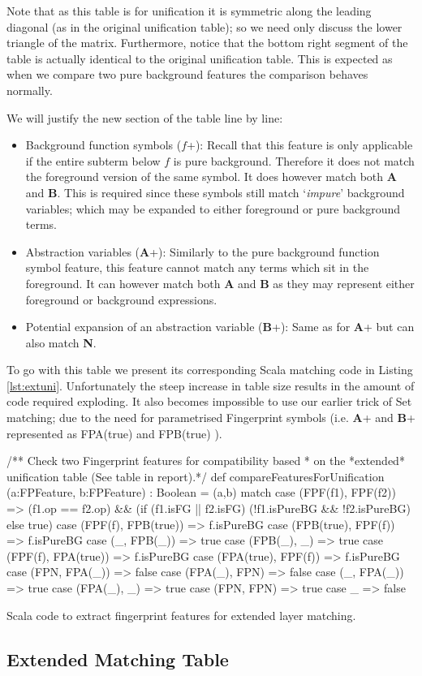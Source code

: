 Note that as this table is for unification it is symmetric along the leading diagonal (as in
the original unification table); so we need only discuss the lower triangle of the matrix.
Furthermore, notice that the bottom right segment of the table is actually identical to
the original unification table. This is expected as when we compare two
pure background features the comparison behaves normally.

We will justify the new section of the table line by line:
\begin{itemize}
\item Background function symbols ($f$+): Recall that this feature is only applicable
if the entire subterm below $f$ is pure background. Therefore it does not
match the foreground version of the same symbol. It does however match both
\textbf{A} and \textbf{B}. This is required since these symbols still match `\emph{impure}' background variables;
which may be expanded to either foreground or pure background terms.
\item Abstraction variables (\textbf{A}+): Similarly to the pure background function symbol
feature, this feature cannot match any terms which sit in the foreground. It can however
match both \textbf{A} and \textbf{B} as they may represent either foreground or background
expressions.
\item Potential expansion of an abstraction variable (\textbf{B}+): Same as for \textbf{A}+
but can also match \textbf{N}.
\end{itemize}

To go with this table we present its corresponding Scala matching code in Listing \ref{lst:extuni}.
Unfortunately the steep increase in table size results in the amount of code required exploding.
It also becomes impossible to use our earlier trick of Set matching; due to the need for parametrised
Fingerprint symbols (i.e. \textbf{A}+ and \textbf{B}+ represented as FPA(true) and FPB(true) ).
\begin{listing}[H]
\begin{scalacode}
 /** Check two Fingerprint features for compatibility based
   * on the *extended* unification table (See table in report).*/
  def compareFeaturesForUnification
      (a:FPFeature, b:FPFeature) : Boolean = 
  (a,b) match {
    case (FPF(f1), FPF(f2))    => (f1.op == f2.op) && 
                                  (if (f1.isFG || f2.isFG) 
                                      (!f1.isPureBG && !f2.isPureBG)
                                   else true)
    case (FPF(f), FPB(true)) => f.isPureBG
    case (FPB(true), FPF(f)) => f.isPureBG
    case (_, FPB(_))         => true
    case (FPB(_), _)         => true
    case (FPF(f), FPA(true)) => f.isPureBG
    case (FPA(true), FPF(f)) => f.isPureBG
    case (FPN, FPA(_))       => false
    case (FPA(_), FPN)       => false
    case (_, FPA(_))         => true
    case (FPA(_), _)         => true
    case (FPN, FPN)          => true
    case _                   => false
  }
\end{scalacode}
\caption{Scala code to extract fingerprint features for extended layer matching.}
\label{lst:extuni}
\end{listing}

\subsection{Extended Matching Table}

